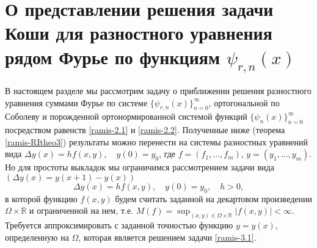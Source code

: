 \chapter{О представлении решения задачи Коши для разностного уравнения рядом Фурье по функциям $\psi_{r,n}(x)$}
В настоящем разделе мы рассмотрим задачу о приближении решения разностного уравнения  суммами  Фурье по системе $\{\psi_{r,n}(x)\}_{n=0}^\infty$, ортогональной по Соболеву и порожденной ортонормированной системой функций $\{\psi_{n}(x)\}_{n=0}^\infty$ посредством равенств \eqref{ramis-2.1} и \eqref{ramis-2.2}.
Полученные ниже (теорема \ref{ramis-RItheo3}) результаты можно перенести на системы разностных  уравнений вида
$\Delta y(x)=hf(x,y), \quad y(0)=y_0$, где $f=(f_1, \ldots, f_m)$, $y=(y_1, \ldots, y_m)$. Но для простоты выкладок мы ограничимся рассмотрением задачи  вида $(\Delta y(x)=y(x+1)-y(x))$
\begin{equation}\label{ramis-3.1}
\Delta y(x)=h f(x,y), \quad y(0)=y_0, \quad h>0,
\end{equation}
в которой функцию   $f(x,y)$  будем считать заданной   на   декартовом произведении $\Omega\times\mathbb{R}$ и ограниченной на нем, т.е. $M(f)=\sup_{(x,y)\in \Omega\times\mathbb{R}}|f(x,y)|<\infty$.   Требуется аппроксимировать с заданной точностью  функцию $y=y(x)$, определенную на $\Omega$, которая является решением задачи \eqref{ramis-3.1}.

